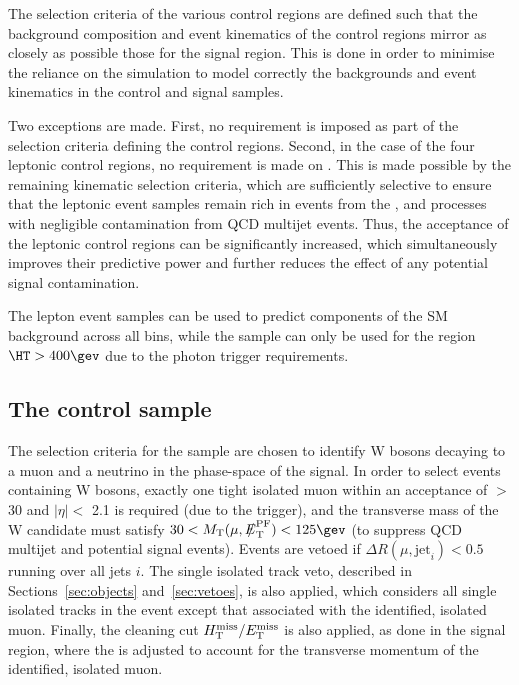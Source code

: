The selection criteria of the various control regions are defined such
that the background composition and event kinematics of the control
regions mirror as closely as possible those for the signal
region. This is done in order to minimise the reliance on the
simulation to model correctly the backgrounds and event kinematics in
the control and signal samples.

Two exceptions are made. First, no \bdphi requirement is imposed as
part of the selection criteria defining the control regions. Second,
in the case of the four leptonic control regions, no requirement is
made on \alphat. This is made possible by the remaining kinematic
selection criteria, which are sufficiently selective to ensure that
the leptonic event samples remain rich in events from the \wj, \ttbar
and \zll processes with negligible contamination from QCD multijet
events. Thus, the acceptance of the leptonic control regions can be
significantly increased, which simultaneously improves their
predictive power and further reduces the effect of any potential
signal contamination.

The lepton event samples can be used to predict components of the SM
background across all \scalht bins, while the \gj sample can only be
used for the region $\HT > 400\gev$ due to the photon trigger
requirements.

\subsection{The \texorpdfstring{\mj}{muon plus jets} control sample}
\label{subsec:mucontrolSelection}


The selection criteria for the \mj sample are chosen to identify W
bosons decaying to a muon and a neutrino in the phase-space of the
signal. In order to select events containing W bosons, exactly one
tight isolated muon within an acceptance of \PT $>$ 30 \gev and
$|\eta| <$ 2.1 is required (due to the trigger), and the transverse
mass of the W candidate must satisfy $30 < \mt(\mu,\pfmet) < 125\gev$
(to suppress QCD multijet and potential signal events). Events are
vetoed if $\Delta R(\mu,\textrm{jet}_i) < 0.5$ running over all jets
$i$. The single isolated track veto, described in
Sections~\ref{sec:objects} and~\ref{sec:vetoes}, is also applied,
which considers all single isolated tracks in the event except that
associated with the identified, isolated muon. Finally, the cleaning
cut $\mbox{$H_{\rm T}^{\rm miss}$}/\mbox{$E_\text{T}^{\rm miss}$}$ is also applied, as done in the signal region, where
the \met is adjusted to account for the transverse momentum of the
identified, isolated muon.

